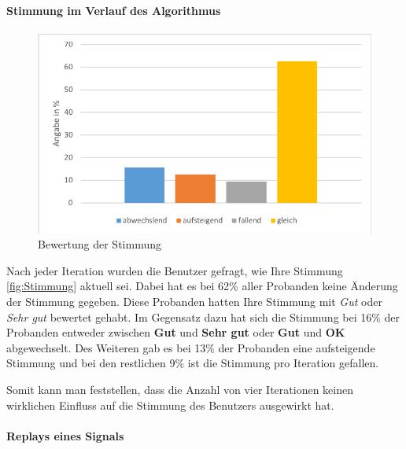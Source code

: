 \paragraph{Stimmung im Verlauf des Algorithmus}

\begin{figure}[htbp] 
            \centering
   	\includegraphics[width=\textwidth]{pics/analyse/person/Stimmung.png}
	\caption{Bewertung der Stimmung}
	\label{fig:Stimmung}
\end{figure}

Nach jeder Iteration wurden die Benutzer gefragt, wie Ihre Stimmung \autoref{fig:Stimmung} aktuell sei. 
Dabei hat es bei 62\% aller Probanden keine {\"A}nderung der Stimmung gegeben. 
Diese Probanden hatten Ihre Stimmung mit \textit{Gut} oder \textit{Sehr gut} bewertet gehabt. 
Im Gegensatz dazu hat sich die Stimmung bei 16\% der Probanden entweder zwischen \textbf{Gut} und \textbf{Sehr gut} oder \textbf{Gut} und \textbf{OK} abgewechselt. 
Des Weiteren gab es bei 13\% der Probanden eine aufsteigende Stimmung und bei den restlichen 9\% ist die Stimmung pro Iteration gefallen.

Somit kann man feststellen, dass die Anzahl von vier Iterationen keinen wirklichen Einfluss auf die Stimmung des Benutzers ausgewirkt hat.


\paragraph{Replays eines Signals}

